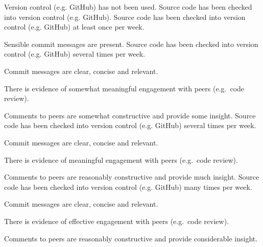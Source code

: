 \documentclass{../../fal_assignment}
\begin{document}
\begin{markingrubric}
%
        \grade\fail Version control (e.g. GitHub) has not been used.
        \grade Source code has been checked into version control (e.g. GitHub).
        \grade Source code has been checked into version control (e.g. GitHub) at least once per week.
            \par Sensible commit messages are present.
        \grade Source code  has been checked into version control (e.g. GitHub) several times per week.
            \par Commit messages are clear, concise and relevant.
            \par There is evidence of somewhat meaningful engagement with peers (e.g.\ code review).
            \par Comments to peers are somewhat constructive and provide some insight.
        \grade Source code has been checked into version control (e.g. GitHub) several times per week.
            \par Commit messages are clear, concise and relevant.
            \par There is evidence of meaningful engagement with peers (e.g.\ code review).
            \par Comments to peers are reasonably constructive and provide much insight.
        \grade Source code has been checked into version control (e.g. GitHub) many times per week.
            \par Commit messages are clear, concise and relevant.
            \par There is evidence of effective engagement with peers (e.g.\ code review).
            \par Comments to peers are reasonably constructive and provide considerable insight.
%
\end{markingrubric}
\end{document}
